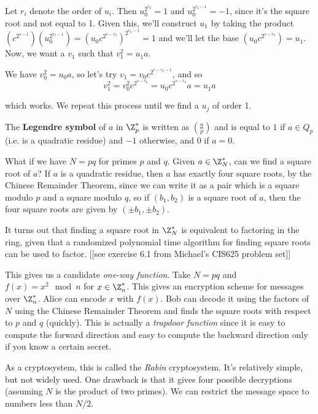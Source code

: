 	Let $r_i$ denote the order of $u_i$.  Then $u_0^{2^{r_0}} = 1$ and $u_0^{2^{r_0-1}} = -1$, since it's the square root and not equal to 1.  Given this, we'll construct $u_1$ by taking the product $(c^{2^{s-1}})(u_0^{2^{r_0-1}}) = (u_0c^{2^{s-r_0}})^{2^{r_0-1}} = 1$ and we'll let the base $(u_0c^{2^{s-r_0}}) = u_1$.  Now, we want a $v_1$ such that $v_1^2 = u_1 a$.  
	
	We have $v_0^2=u_0a$, so let's try $v_1=v_0 c^{2^{s-r_0-1}}$, and so $$v_1^2 = v_0^2 c^{2^{s-r_0}} = u_0c^{2^{s-r_0}} a = u_1a$$
	
	which works.  We repeat this process until we find a $u_j$ of order 1.
	
	
\begin{definition}
	
	The \textbf{Legendre symbol} of $a$ in $\Z_p^*$ is written as $\left(\frac{a}{p}\right)$ and is equal to $1$ if $a\in Q_p$ (i.e. is a quadratic residue) and $-1$ otherwise, and 0 if $a=0$.
	
\end{definition}

What if we have $N=pq$ for primes $p$ and $q$.  Given $a\in \Z_N^*$, can we find a square root of $a$? If $a$ is a quadratic residue, then $a$ has exactly four square roots, by the Chinese Remainder Theorem, since we can write it as a pair which is a square modulo $p$ and a square modulo $q$, so if $(b_1,b_2)$ is a square root of $a$, then the four square roots are given by $(\pm b_1,\pm b_2)$.

It turns out that finding a square root in $\Z_N^*$ is equivalent to factoring in the ring, given that a randomized polynomial time algorithm for finding square roots can be used to factor. [[see exercise 6.1 from Michael's CIS625 problem set]]

This gives us a candidate \textit{one-way function}. Take $N=pq$ and $f(x)=x^2 \mod n$ for $x\in\Z_n^*$.  This gives an encryption scheme for messages over $\Z_n^*$.  Alice can encode $x$ with $f(x)$.  Bob can decode it using the factors of $N$ using the Chinese Remainder Theorem and finds the square roots with respect to $p$ and $q$ (quickly).  This is actually a \textit{trapdoor function} since it is easy to compute the forward direction and easy to compute the backward direction only if you know a certain secret.

As a cryptosystem, this is called the \textit{Rabin} cryptosystem. It's relatively simple, but not widely used.  One drawback is that it gives four possible decryptions (assuming $N$ is the product of two primes).  We can restrict the message space to numbers less than $N/2$.

